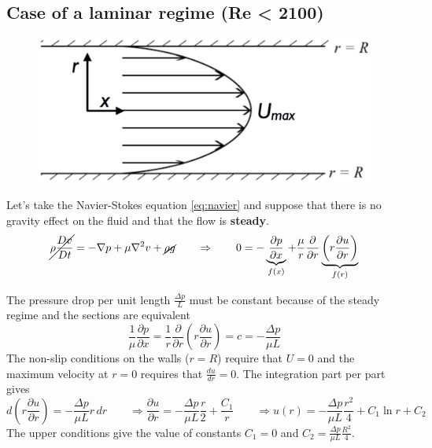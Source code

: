 	\subsection{Case of a laminar regime (Re < 2100)}
		\begin{figure}
		\vspace{-15mm}
		\includegraphics[scale=0.25]{ch2/6}
		\end{figure}
		Let's take the Navier-Stokes equation \autoref{eq:navier} and suppose that there is no gravity effect on the fluid and that the flow is \textbf{steady}. 
		\begin{equation}
			\cancel{\rho \frac{Dv}{Dt}} = -\nabla p + \mu \nabla ^2 v + \cancel{\rho g} 
			\qquad \Rightarrow \qquad 
			0 = -\underbrace{\frac{\partial p}{\partial x}}_{f(x)} + \frac{\mu }{r} \frac{\partial}{\partial r} \underbrace{\left( r\frac{\partial u}{\partial r}\right)}_{f(r)}
		\end{equation}

		The pressure drop per unit length $\frac{\Delta p}{L}$ must be constant because of the steady regime and the sections are equivalent
		\begin{equation}
			\frac{1}{\mu}\frac{\partial p}{\partial x} = \frac{1}{r} \frac{\partial}{\partial r} \left( r\frac{\partial u}{\partial r} \right) = c = - \frac{\Delta p}{\mu L}
		\end{equation}
		The non-slip conditions on the walls ($r=R$) require that $U = 0$ and the maximum velocity at $r=0$ requires that $\frac{du}{dr} = 0$. The integration part per part gives
		\begin{equation}
			d \left( r\frac{\partial u}{\partial r} \right) = - \frac{\Delta p}{\mu L} r\, dr 
			\qquad \Rightarrow 
			\frac{\partial u}{\partial r} = -\frac{\Delta p}{\mu L} \frac{r}{2} + \frac{C_1}{r} 
			\qquad \Rightarrow 
			u(r) = -\frac{\Delta p}{\mu L} \frac{r^2}{4} + C_1 \ln r + C_2 
		\end{equation}
		The upper conditions give the value of constants $C_1 = 0$ and $C_2 = \frac{\Delta p}{\mu L}\frac{R^2}{4}$. \\
		
